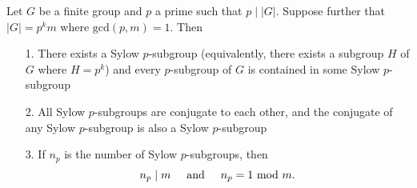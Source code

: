     \begin{thm} Let $G$ be a finite group and $p$ a
    prime such that $p \mid |G|$. Suppose further that $|G| = p^km$
    where $\mbox{gcd}(p, m) = 1$. Then 
    \begin{itemize}
        \item[1.] There exists a Sylow $p$-subgroup (equivalently, there
        exists a subgroup $H$ of $G$ where $H = p^k$) and every
        $p$-subgroup of $G$ is contained in some Sylow $p$-subgroup 

        \item[2.] All Sylow $p$-subgroups are conjugate to each other,
       and the conjugate of any Sylow $p$-subgroup is also a Sylow
       $p$-subgroup
       \item[3.] If $n_p$ is the number of Sylow $p$-subgroups, then 
       \[
           n_p \mid m \hspace{0.5cm}\text{and}\hspace{0.5cm} n_p = 1 \mbox{ mod } m.
       \] 
    \end{itemize}
    \vspace{-.4cm}
    \end{thm}

